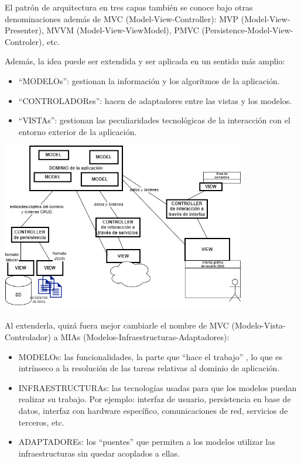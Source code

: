 \documentclass[spanish,12pt,a4paper,final,oneside]{book}
\begin{document}
El patrón de arquitectura en tres capas también se conoce bajo otras denominaciones además de MVC ({\footnotesize Model-View-Controller}):  MVP ({\footnotesize Model-View-Presenter}), MVVM ({\footnotesize Model-View-ViewModel}), PMVC ({\footnotesize Persistence-Model-View-Controler}), etc.

Además, la idea puede ser extendida y ser aplicada en un sentido más amplio:
\begin{itemize}
\item ``MODELOs'': gestionan la información y los algoritmos de la aplicación.
\item ``CONTROLADORes'': hacen de adaptadores entre las vistas y los modelos.
\item ``VISTAs'': gestionan las peculiaridades tecnológicas de la interacción con el entorno exterior de la aplicación.
\end{itemize}
\begin{center}\includegraphics[width=0.8\textwidth]{division en capas - MVC -ampliada-}\end{center}

Al extenderla, quizá fuera mejor cambiarle el nombre de MVC ({\footnotesize Modelo-Vista-Controlador}) a MIAs ({\footnotesize Modelos-Infraestructuras-Adaptadores}):
\begin{itemize}

\item MODELOs: las funcionalidades, la parte que ``hace el trabajo'' , lo que es intrínseco a la resolución de las tareas relativas al dominio de aplicación.

\item INFRAESTRUCTURAs: las tecnologías usadas para que los modelos puedan realizar su trabajo. Por ejemplo: interfaz de usuario, persistencia en base de datos, interfaz con hardware específico, comunicaciones de red, servicios de terceros, etc.

\item ADAPTADOREs: los ``puentes'' que permiten a los modelos utilizar las infraestructuras sin quedar acoplados a ellas.

\end{itemize}
\end{document}
